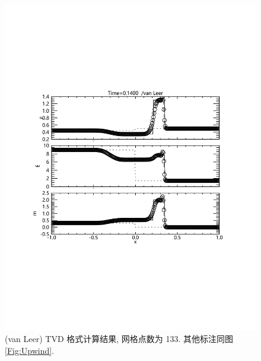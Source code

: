 \documentclass[10.5pt
]{article}
\begin{document}
\begin{figure}
\begin{center}
\includegraphics[width=.85\textwidth]{fig_tvd.pdf}
\caption{(van Leer) TVD 格式计算结果, 网格点数为 133. 其他标注同图\ref{Fig:Upwind}.}\label{Fig:vanLeerA}
\end{center}
\end{figure}
\end{document}
